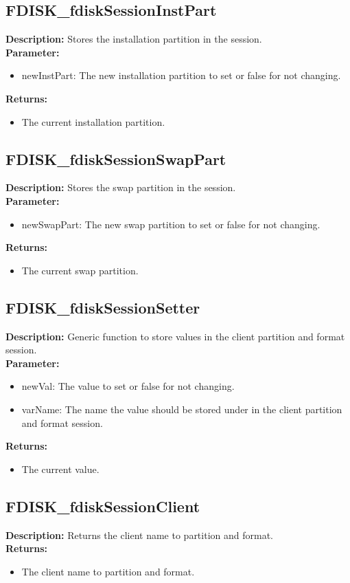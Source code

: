 \subsection{FDISK\_fdiskSessionInstPart}
\textbf{Description:} Stores the installation partition in the session.\\
\textbf{Parameter:}
\begin{itemize}
\item newInstPart: The new installation partition to set or false for not changing.
\end{itemize}
\textbf{Returns:}
\begin{itemize}
\item The current installation partition.
\end{itemize}

\subsection{FDISK\_fdiskSessionSwapPart}
\textbf{Description:} Stores the swap partition in the session.\\
\textbf{Parameter:}
\begin{itemize}
\item newSwapPart: The new swap partition to set or false for not changing.
\end{itemize}
\textbf{Returns:}
\begin{itemize}
\item The current swap partition.
\end{itemize}

\subsection{FDISK\_fdiskSessionSetter}
\textbf{Description:} Generic function to store values in the client partition and format session.\\
\textbf{Parameter:}
\begin{itemize}
\item newVal: The value to set or false for not changing.
\item varName: The name the value should be stored under in the client partition and format session.
\end{itemize}
\textbf{Returns:}
\begin{itemize}
\item The current value.
\end{itemize}

\subsection{FDISK\_fdiskSessionClient}
\textbf{Description:} Returns the client name to partition and format.\\
\textbf{Returns:}
\begin{itemize}
\item The client name to partition and format.
\end{itemize}

